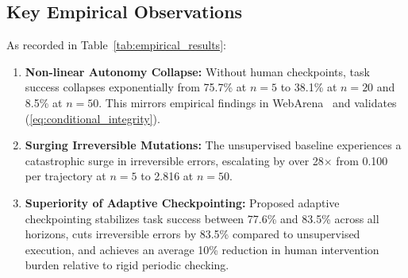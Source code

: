 \documentclass[conference]{IEEEtran}
\begin{document}
\subsection{Key Empirical Observations}
As recorded in Table~\ref{tab:empirical_results}:
\begin{enumerate}
    \item \textbf{Non-linear Autonomy Collapse:} Without human checkpoints, task success collapses exponentially from 75.7\% at $n=5$ to 38.1\% at $n=20$ and 8.5\% at $n=50$. This mirrors empirical findings in WebArena~\cite{zhou2024webarena} and validates (\ref{eq:conditional_integrity}).
    \item \textbf{Surging Irreversible Mutations:} The unsupervised baseline experiences a catastrophic surge in irreversible errors, escalating by over 28$\times$ from 0.100 per trajectory at $n=5$ to 2.816 at $n=50$.
    \item \textbf{Superiority of Adaptive Checkpointing:} Proposed adaptive checkpointing stabilizes task success between 77.6\% and 83.5\% across all horizons, cuts irreversible errors by 83.5\% compared to unsupervised execution, and achieves an average 10\% reduction in human intervention burden relative to rigid periodic checking.
\end{enumerate}
\end{document}

